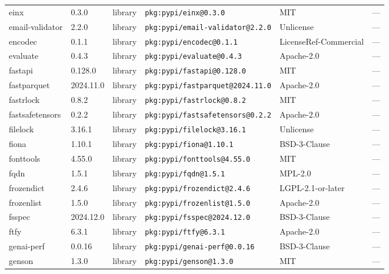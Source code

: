 \documentclass[11pt,a4paper]{article}
\begin{document}
\begin{longtable}{|p{4cm}|p{2cm}|p{1.6cm}|p{5cm}|p{1.5cm}|p{3.5cm}|}
\raggedright einx & 0.3.0 & library & \small\texttt{pkg:pypi/einx@0.3.0} & MIT & \small — \\
\raggedright email-validator & 2.2.0 & library & \small\texttt{pkg:pypi/email-validator@2.2.0} & Unlicense & \small — \\
\raggedright encodec & 0.1.1 & library & \small\texttt{pkg:pypi/encodec@0.1.1} & LicenseRef-Commercial & \small — \\
\raggedright evaluate & 0.4.3 & library & \small\texttt{pkg:pypi/evaluate@0.4.3} & Apache-2.0 & \small — \\
\raggedright fastapi & 0.128.0 & library & \small\texttt{pkg:pypi/fastapi@0.128.0} & MIT & \small — \\
\raggedright fastparquet & 2024.11.0 & library & \small\texttt{pkg:pypi/fastparquet@2024.11.0} & Apache-2.0 & \small — \\
\raggedright fastrlock & 0.8.2 & library & \small\texttt{pkg:pypi/fastrlock@0.8.2} & MIT & \small — \\
\raggedright fastsafetensors & 0.2.2 & library & \small\texttt{pkg:pypi/fastsafetensors@0.2.2} & Apache-2.0 & \small — \\
\raggedright filelock & 3.16.1 & library & \small\texttt{pkg:pypi/filelock@3.16.1} & Unlicense & \small — \\
\raggedright fiona & 1.10.1 & library & \small\texttt{pkg:pypi/fiona@1.10.1} & BSD-3-Clause & \small — \\
\raggedright fonttools & 4.55.0 & library & \small\texttt{pkg:pypi/fonttools@4.55.0} & MIT & \small — \\
\raggedright fqdn & 1.5.1 & library & \small\texttt{pkg:pypi/fqdn@1.5.1} & MPL-2.0 & \small — \\
\raggedright frozendict & 2.4.6 & library & \small\texttt{pkg:pypi/frozendict@2.4.6} & LGPL-2.1-or-later & \small — \\
\raggedright frozenlist & 1.5.0 & library & \small\texttt{pkg:pypi/frozenlist@1.5.0} & Apache-2.0 & \small — \\
\raggedright fsspec & 2024.12.0 & library & \small\texttt{pkg:pypi/fsspec@2024.12.0} & BSD-3-Clause & \small — \\
\raggedright ftfy & 6.3.1 & library & \small\texttt{pkg:pypi/ftfy@6.3.1} & Apache-2.0 & \small — \\
\raggedright genai-perf & 0.0.16 & library & \small\texttt{pkg:pypi/genai-perf@0.0.16} & BSD-3-Clause & \small — \\
\raggedright genson & 1.3.0 & library & \small\texttt{pkg:pypi/genson@1.3.0} & MIT & \small — \\

\end{longtable}
\end{document}
